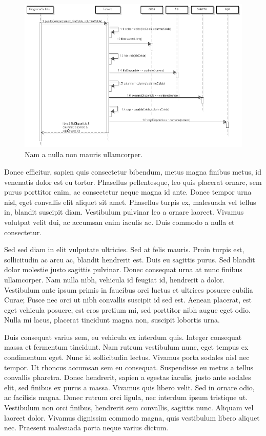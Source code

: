 \documentclass[titlepage,a4paper]{article}
\begin{document}
\begin{figure}[H]
\centering
\includegraphics[width=\textwidth]{diagrama_secuencia02.png}
\caption{\label{fig:seq02}Nam a nulla non mauris ullamcorper.}
\end{figure}

Donec efficitur, sapien quis consectetur bibendum, metus magna finibus metus, id venenatis dolor est eu tortor. Phasellus pellentesque, leo quis placerat ornare, sem purus porttitor enim, ac consectetur neque magna id ante. Donec tempor urna nisl, eget convallis elit aliquet sit amet. Phasellus turpis ex, malesuada vel tellus in, blandit suscipit diam. Vestibulum pulvinar leo a ornare laoreet. Vivamus volutpat velit dui, ac accumsan enim iaculis ac. Duis commodo a nulla et consectetur.

Sed sed diam in elit vulputate ultricies. Sed at felis mauris. Proin turpis est, sollicitudin ac arcu ac, blandit hendrerit est. Duis eu sagittis purus. Sed blandit dolor molestie justo sagittis pulvinar. Donec consequat urna at nunc finibus ullamcorper. Nam nulla nibh, vehicula id feugiat id, hendrerit a dolor. Vestibulum ante ipsum primis in faucibus orci luctus et ultrices posuere cubilia Curae; Fusce nec orci ut nibh convallis suscipit id sed est. Aenean placerat, est eget vehicula posuere, est eros pretium mi, sed porttitor nibh augue eget odio. Nulla mi lacus, placerat tincidunt magna non, suscipit lobortis urna.

Duis consequat varius sem, eu vehicula ex interdum quis. Integer consequat massa et fermentum tincidunt. Nam rutrum vestibulum nunc, eget tempus ex condimentum eget. Nunc id sollicitudin lectus. Vivamus porta sodales nisl nec tempor. Ut rhoncus accumsan sem eu consequat. Suspendisse eu metus a tellus convallis pharetra. Donec hendrerit, sapien a egestas iaculis, justo ante sodales elit, sed finibus ex purus a massa. Vivamus quis libero velit. Sed in ornare odio, ac facilisis magna. Donec rutrum orci ligula, nec interdum ipsum tristique ut. Vestibulum non orci finibus, hendrerit sem convallis, sagittis nunc. Aliquam vel laoreet dolor. Vivamus dignissim commodo magna, quis vestibulum libero aliquet nec. Praesent malesuada porta neque varius dictum.
\end{document}
